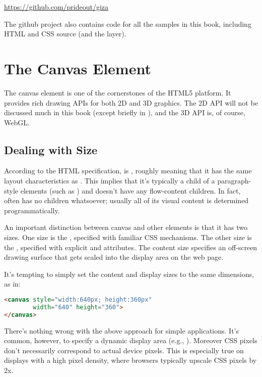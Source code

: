 \url{https://github.com/prideout/giza}

The github project also contains code for all the samples in this book, including HTML and CSS source (and the  layer).

\section{The Canvas Element}

The canvas element  is one of the cornerstones of the HTML5 platform.  It provides rich drawing APIs for both 2D and 3D graphics.  The 2D API will not be discussed much in this book (except briefly in ), and the 3D API is, of course, WebGL.

\subsection{Dealing with Size}

According to the HTML specification,  is , roughly meaning that it has the same layout characteristics as .  This implies that it's typically a child of a paragraph-style elements (such as ) and doesn't have any flow-content children.  In fact,  often has no children whatsoever; usually all of its visual content is determined programmatically.

An important distinction between canvas and other elements is that it has two  sizes.  One size is the , specified with familiar  CSS mechanisms.  The other size is the , specified with explicit   and   attributes.  The content size specifies an off-screen drawing surface that gets scaled into the display area on the web page.

It's tempting to simply set the content and display sizes to the same dimensions, as in:

\begin{lstlisting}[language=HTML]
<canvas style="width:640px; height:360px"
        width="640" height="360">
</canvas>
\end{lstlisting}

There's nothing wrong with the above approach for simple applications.  It's common, however, to specify a dynamic display area (e.g., ).  Moreover CSS pixels don't necessarily correspond to actual device pixels.  This is especially true on displays with a high pixel density, where browsers typically upscale CSS pixels by 2x.

